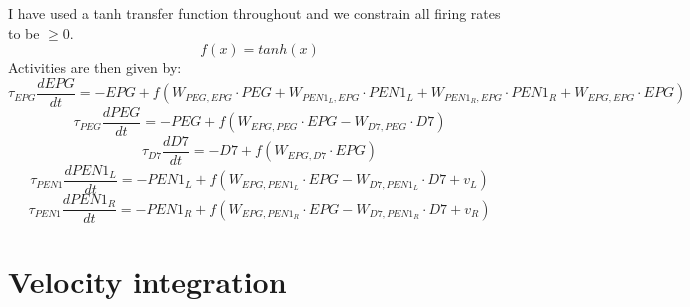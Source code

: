 \documentclass{article}
\begin{document}
I have used a tanh transfer function throughout and we constrain all firing rates to be $\geq 0$.
\begin{equation}
f(x) = tanh(x)
\end{equation}
Activities are then given by:
\begin{equation}
\tau_{EPG} \dfrac{dEPG}{dt} = -EPG + f(W_{PEG,EPG}\cdot PEG + W_{PEN1_L,EPG}\cdot PEN1_L + W_{PEN1_R,EPG}\cdot PEN1_R + W_{EPG,EPG}\cdot EPG)
\end{equation}
\begin{equation}
\tau_{PEG} \dfrac{dPEG}{dt} = -PEG + f(W_{EPG,PEG}\cdot EPG - W_{D7,PEG}\cdot D7 )
\end{equation}
\begin{equation}
\tau_{D7} \dfrac{dD7}{dt} =-D7 + f(W_{EPG,D7}\cdot EPG)
\end{equation}
\begin{equation}
\tau_{PEN1} \dfrac{dPEN1_L}{dt} = -PEN1_L + f(W_{EPG,PEN1_L}\cdot EPG - W_{D7,PEN1_L}\cdot D7 + v_L )
\end{equation}
\begin{equation}
\tau_{PEN1} \dfrac{dPEN1_R}{dt} = -PEN1_R + f(W_{EPG,PEN1_R}\cdot EPG - W_{D7,PEN1_R}\cdot D7 + v_R )
\end{equation}


\newpage


\section*{Velocity integration}
\end{document}
